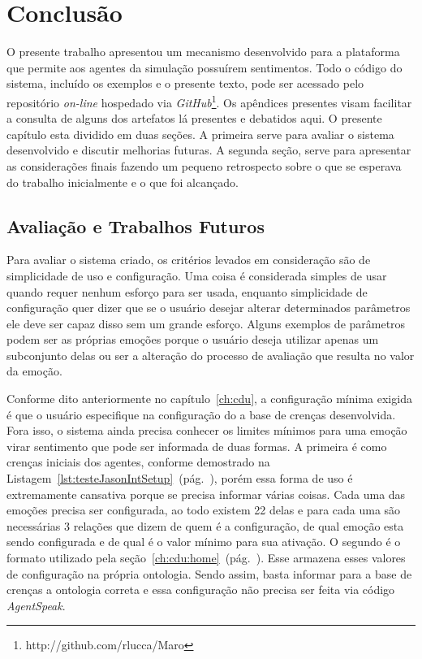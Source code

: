 \chapter{Conclusão} \label{ch:cf}

O presente trabalho apresentou um mecanismo desenvolvido para a plataforma
\jason que permite aos agentes da simulação possuírem sentimentos. Todo o
código do sistema, incluído os exemplos e o presente texto, pode ser acessado
pelo repositório \emph{on-line} hospedado via
\emph{GitHub}\footnote{http://github.com/rlucca/Maro}.
Os apêndices presentes visam facilitar a consulta de alguns dos artefatos lá
presentes e debatidos aqui.
O presente capítulo esta dividido em duas seções. A primeira serve para
avaliar o sistema desenvolvido e discutir melhorias futuras. A segunda seção,
serve para apresentar as considerações finais fazendo um pequeno retrospecto
sobre o que se esperava do trabalho inicialmente e o que foi alcançado.


\section{Avaliação e Trabalhos Futuros}

Para avaliar o sistema criado, os critérios levados em consideração são de
simplicidade de uso e configuração. Uma coisa é considerada simples de usar
quando requer nenhum esforço para ser usada, enquanto simplicidade de
configuração quer dizer que se o usuário desejar alterar determinados
parâmetros ele deve ser capaz disso sem um grande esforço. Alguns exemplos de
parâmetros podem ser as próprias emoções porque o usuário deseja utilizar
apenas um subconjunto delas ou ser a alteração do processo de avaliação que
resulta no valor da emoção.

Conforme dito anteriormente no capítulo~\ref{ch:cdu}, a configuração mínima
exigida é que o usuário especifique na configuração do \jason a base de
crenças desenvolvida. Fora isso, o sistema ainda precisa conhecer os limites
mínimos para uma emoção virar sentimento que pode ser informada de duas
formas. A primeira é como crenças iniciais dos agentes, conforme demostrado na
Listagem~\ref{lst:testeJasonIntSetup}~(pág.~\pageref{lst:testeJasonIntSetup}),
porém essa forma de uso é extremamente cansativa porque se precisa informar
várias coisas. Cada uma das emoções precisa ser configurada, ao todo existem
22 delas e para cada uma são necessárias 3 relações que dizem de quem é a
configuração, de qual emoção esta sendo configurada e de qual é o valor mínimo
para sua ativação. O segundo é o formato utilizado pela
seção~\ref{ch:cdu:home}~(pág.~\pageref{ch:cdu:home}). Esse armazena esses
valores de configuração na própria ontologia. Sendo assim, basta informar para
a base de crenças a ontologia correta e essa configuração não precisa ser
feita via código \emph{AgentSpeak}.

